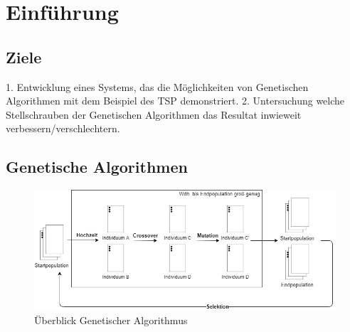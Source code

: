 
\section{Einführung}

\subsection{Ziele}

1. Entwicklung eines Systems, das die Möglichkeiten von Genetischen Algorithmen mit dem Beispiel des TSP demonstriert.
2. Untersuchung welche Stellschrauben der Genetischen Algorithmen das Resultat inwieweit verbessern/verschlechtern.


\subsection{Genetische Algorithmen}
\begin{figure}[H]
\centering
\includegraphics[width=1\textwidth]{img/Vortrag/Genetic_Algorithm.png}
\caption{Überblick Genetischer Algorithmus}
\label{fig:genetic_algorithm}
\end{figure}

